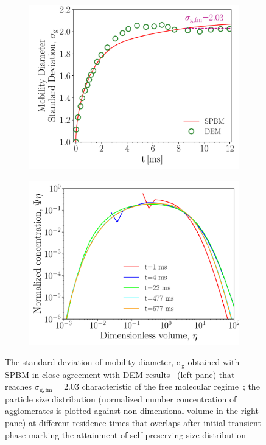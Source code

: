 \begin{figure}[!htbp]
	\centering
	\begin{subfigure}[t]{0.4\textwidth}
		\centering
		\includegraphics[width=1\textwidth]{Figures/Results/Validation/Coagulation/sigmag.pdf}
	\end{subfigure}
	\begin{subfigure}[t]{0.4\textwidth}
		\centering
		\includegraphics[width=1\textwidth]{Figures/Results/Validation/Coagulation/PSD.pdf}
	\end{subfigure}
	\caption{The standard deviation of mobility diameter, $\mathrm{\sigma_g}$ obtained with SPBM in close agreement with DEM results~\citep{kholghy2021surface} (left pane) that reaches $\mathrm{\sigma_{g,fm}=2.03}$ characteristic of the free molecular regime~\citep{vemury1995self}; the particle size distribution (normalized number concentration of agglomerates is plotted against non-dimensional volume in the right pane) at different residence times that overlaps after initial transient phase marking the attainment of self-preserving size distribution}
	\label{fig:coagvalid_sigmapsd}
\end{figure}

